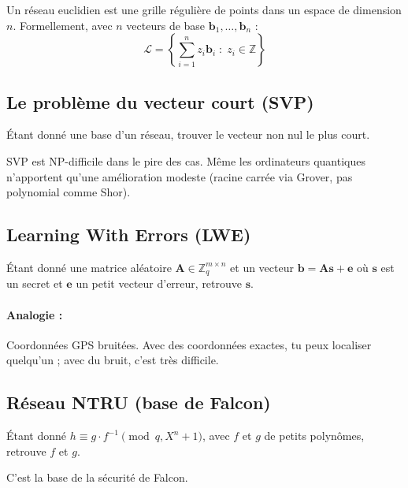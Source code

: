 \documentclass[11pt,a4paper]{article}
\begin{document}
Un réseau euclidien est une grille régulière de points dans un espace de dimension $n$. Formellement, avec $n$ vecteurs de base $\mathbf{b}_1, \ldots, \mathbf{b}_n$ :
\[\mathcal{L} = \left\{ \sum_{i=1}^n z_i \mathbf{b}_i \; : \; z_i \in \mathbb{Z} \right\}\]

\subsection{Le problème du vecteur court (SVP)}

\begin{warningbox}
Étant donné une base d'un réseau, trouver le vecteur non nul le plus court.
\end{warningbox}

SVP est NP-difficile dans le pire des cas. Même les ordinateurs quantiques n'apportent qu'une amélioration modeste (racine carrée via Grover, pas polynomial comme Shor).

\subsection{Learning With Errors (LWE)}

\begin{infobox}
Étant donné une matrice aléatoire $\mathbf{A} \in \mathbb{Z}_q^{m \times n}$ et un vecteur $\mathbf{b} = \mathbf{A}\mathbf{s} + \mathbf{e}$ où $\mathbf{s}$ est un secret et $\mathbf{e}$ un petit vecteur d'erreur, retrouve $\mathbf{s}$.
\end{infobox}

\paragraph{Analogie :} Coordonnées GPS bruitées. Avec des coordonnées exactes, tu peux localiser quelqu'un ; avec du bruit, c'est très difficile.

\subsection{Réseau NTRU (base de Falcon)}

\begin{infobox}
Étant donné $h \equiv g \cdot f^{-1} \pmod{q, X^n+1}$, avec $f$ et $g$ de petits polynômes, retrouve $f$ et $g$.
\end{infobox}

C'est la base de la sécurité de Falcon.
\end{document}
